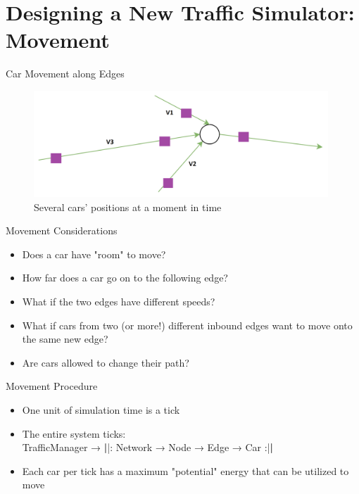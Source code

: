 \section{Designing a New Traffic Simulator:  Movement}

    \frame{\sectionpage}
    
    \begin{frame}{Car Movement along Edges}
        \begin{figure}
            \centering
            \includegraphics[height=4cm]{Images/movement_node.png}
            \caption{Several cars' positions at a moment in time}
        \end{figure}
    \end{frame}
    
    
    \begin{frame}{Movement Considerations}
        \begin{itemize}
            \item Does a car have "room" to move?
            \item How far does a car go on to the following edge?
            \item What if the two edges have different speeds?
            \item What if cars from two (or more!) different inbound edges want to move onto the same new edge?
            \item Are cars allowed to change their path?
        \end{itemize}
    \end{frame}   
    
    
    \begin{frame}{Movement Procedure}
        \begin{itemize}
            \item One unit of simulation time is a tick
            \item The entire system ticks:  \\
            TrafficManager → \textbf{|}|: Network → Node → Edge → Car :|\textbf{|}
            \item Each car per tick has a maximum "potential" energy that can be utilized to move
        \end{itemize}
    \end{frame}   
    
